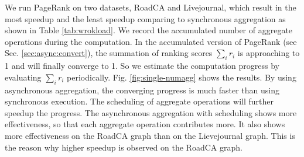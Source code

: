 \begin{appendix}
 We run PageRank on two datasets, RoadCA and Livejournal, which result in the most speedup and the least speedup comparing to synchronous aggregation as shown in Table \ref{tab:wrokload}. We record the accumulated number of aggregate operations during the computation. In the accumulated version of PageRank (see Sec. \ref{sec:async:convert}), the summation of ranking scores $\sum_i{r_i}$ is approaching to 1 and will finally converge to 1. So we estimate the computation progress by evaluating $\sum_i{r_i}$ periodically. Fig. \ref{fig:single-numagg} shows the results. By using asynchronous aggregation, the converging progress is much faster than using synchronous execution. The scheduling of aggregate operations will further speedup the progress. The asynchronous aggregation with scheduling shows more effectiveness, so that each aggregate operation contributes more. It also shows more effectiveness on the RoadCA graph than on the Lievejournal graph. This is the reason why higher speedup is observed on the RoadCA graph.

\end{appendix}

